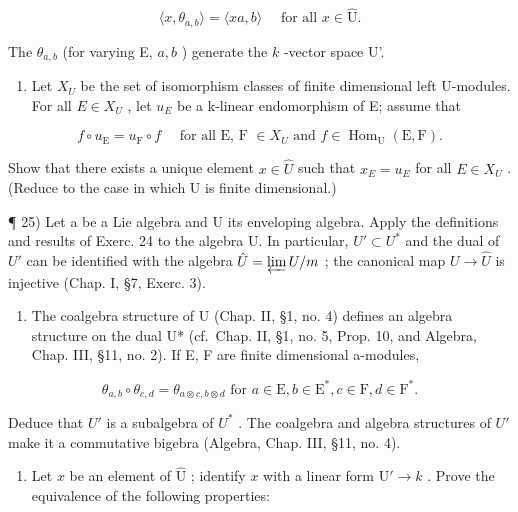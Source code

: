 \[
\langle x, \theta_ {a, b} \rangle = \langle x a, b \rangle \quad \text { for   all } x \in \hat {\mathrm{U}}.
\]

The \(\theta_{a,b}\) (for varying E, \(a,b\) ) generate the \(k\) -vector space U'.

\begin{enumerate}
\def\labelenumi{\alph{enumi})}
\setcounter{enumi}{2}
\tightlist
\item
  Let \(X_{U}\) be the set of isomorphism classes of finite dimensional left U-modules. For all \(E \in X_{U}\) , let \(u_{E}\) be a k-linear endomorphism of E; assume that
\end{enumerate}

\[
f \circ u _ {\mathrm{E}} = u _ {\mathrm{F}} \circ f \quad \text { for   all   E, F } \in X_{U} \text { and } f \in \operatorname{Hom} _ {\mathrm{U}} (\mathrm{E,F}).
\]

Show that there exists a unique element \(x \in \hat{U}\) such that \(x_{E} = u_{E}\) for all \(E \in X_{U}\) . (Reduce to the case in which U is finite dimensional.)

¶ 25) Let a be a Lie algebra and U its enveloping algebra. Apply the definitions and results of Exerc. 24 to the algebra U. In particular, \(U' \subset U^*\) and the dual of \(U'\) can be identified with the algebra \(\hat{U} = \varprojlim U/m\) ; the canonical map \(U \to \hat{U}\) is injective (Chap. I, §7, Exerc. 3).

\begin{enumerate}
\def\labelenumi{\alph{enumi})}
\tightlist
\item
  The coalgebra structure of U (Chap. II, §1, no. 4) defines an algebra structure on the dual U* (cf.~Chap. II, §1, no. 5, Prop. 10, and Algebra, Chap. III, §11, no. 2). If E, F are finite dimensional a-modules,
\end{enumerate}

\[
\theta_ {a, b} \circ \theta_ {c, d} = \theta_ {a \otimes c, b \otimes d} \text { for } a \in \mathrm{E}, b \in \mathrm{E} ^ {*}, c \in \mathrm{F}, d \in \mathrm{F} ^ {*}.
\]

Deduce that \(U'\) is a subalgebra of \(U^{*}\) . The coalgebra and algebra structures of \(U'\) make it a commutative bigebra (Algebra, Chap. III, §11, no. 4).

\begin{enumerate}
\def\labelenumi{\alph{enumi})}
\setcounter{enumi}{1}
\tightlist
\item
  Let \(x\) be an element of \(\hat{\mathrm{U}}\) ; identify \(x\) with a linear form \(\mathrm{U}' \to k\) . Prove the equivalence of the following properties:
\end{enumerate}

